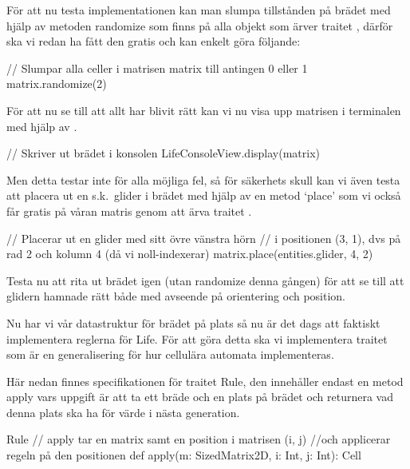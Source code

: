        För att nu testa implementationen kan man slumpa tillstånden på brädet med hjälp av metoden randomize som finns på
        alla objekt som ärver traitet , därför ska vi redan ha fått den gratis och kan enkelt göra följande:

\begin{Code}
// Slumpar alla celler i matrisen matrix till antingen 0 eller 1
matrix.randomize(2)
\end{Code}

        För att nu se till att allt har blivit rätt kan vi nu visa upp matrisen i terminalen med hjälp av .

\begin{Code}
// Skriver ut brädet i konsolen
LifeConsoleView.display(matrix)
\end{Code}

        Men detta testar inte för alla möjliga fel, så för säkerhets skull kan vi även testa att placera ut en s.k.\ glider i brädet med hjälp av en metod `place' som vi också får gratis på våran matris genom att ärva traitet .

\begin{Code}
// Placerar ut en glider med sitt övre vänstra hörn
// i positionen (3, 1), dvs på rad 2 och kolumn 4 (då vi noll-indexerar)
matrix.place(entities.glider, 4, 2)
\end{Code}

        Testa nu att rita ut brädet igen (utan randomize denna gången) för att se till att glidern hamnade rätt både med avseende på orientering och position.


    Nu har vi vår datastruktur för brädet på plats så nu är det dags att faktiskt implementera reglerna för Life.
    För att göra detta ska vi implementera traitet  som är en generalisering för hur cellulära automata implementeras.

        Här nedan finnes specifikationen för traitet Rule, den innehåller endast en metod apply vars
        uppgift är att ta ett bräde och en plats på brädet och returnera vad denna plats ska ha för
        värde i nästa generation.

\begin{ScalaSpec}{Rule}
// apply tar en matrix samt en position i matrisen (i, j)
//och applicerar regeln på den positionen
def apply(m: SizedMatrix2D, i: Int, j: Int): Cell
\end{ScalaSpec}


